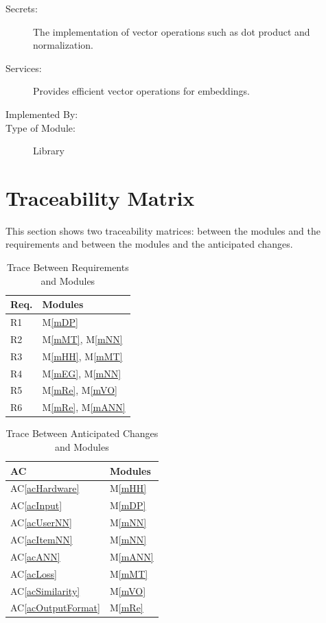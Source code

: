 \documentclass[12pt, titlepage]{article}
\newcommand{\acref}[1]{AC\ref{#1}}
\newcommand{\mref}[1]{M\ref{#1}}
\begin{document}
\begin{description}
\item[Secrets:]The implementation of vector operations such as dot product and normalization.
\item[Services:]Provides efficient vector operations for embeddings.
\item[Implemented By:] \progname
\item[Type of Module:] Library
\end{description}

\section{Traceability Matrix} \label{SecTM}

This section shows two traceability matrices: between the modules and the
requirements and between the modules and the anticipated changes.

\begin{table}[H]
\centering
\begin{tabular}{p{} p{}}
\toprule
\textbf{Req.} & \textbf{Modules}\\
\midrule
R1 & \mref{mDP}\\
R2 & \mref{mMT}, \mref{mNN}\\
R3 & \mref{mHH}, \mref{mMT}\\
R4 & \mref{mEG}, \mref{mNN}\\
R5 & \mref{mRe}, \mref{mVO}\\
R6 & \mref{mRe}, \mref{mANN}\\
\bottomrule
\end{tabular}
\caption{Trace Between Requirements and Modules}
\label{TblRT}
\end{table}

\begin{table}[H]
\centering
\begin{tabular}{p{} p{}}
\toprule
\textbf{AC} & \textbf{Modules}\\
\midrule
\acref{acHardware} & \mref{mHH}\\
\acref{acInput} & \mref{mDP}\\
\acref{acUserNN} & \mref{mNN}\\
\acref{acItemNN} & \mref{mNN}\\
\acref{acANN} & \mref{mANN}\\
\acref{acLoss} & \mref{mMT}\\
\acref{acSimilarity} & \mref{mVO}\\
\acref{acOutputFormat} & \mref{mRe}\\
\bottomrule
\end{tabular}
\caption{Trace Between Anticipated Changes and Modules}
\label{TblACT}
\end{table}
\end{document}
